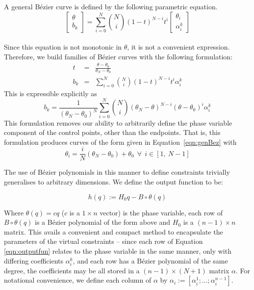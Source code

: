 A general Bézier curve is defined by the following parametric equation.
\begin{equation}
	\begin{bmatrix}
		\theta \\ b_k
	\end{bmatrix}
	=
	\sum_{i=0}^{N}\binom{N}{i}\left(1-t\right)^{N-i}t^i
	\begin{bmatrix}
		\theta_i \\ \alpha^k_i
	\end{bmatrix} \label{eqn:genBez}
\end{equation} \\
Since this equation is not monotonic in $\theta$, it is not a convenient expression. Therefore, we build families of Bézier curves with the following formulation:
\begin{eqnarray}
	t &=& \frac{\theta - \theta_0}{\theta_N - \theta_0} \\
	b_k &=& \sum_{i=0}^{N}\binom{N}{i}\left(1-t\right)^{N-i}t^i\alpha^k_i
\end{eqnarray}
This is expressible explicitly as
\begin{equation}
	b_k = \frac{1}{\left(\theta_N - \theta_0\right)^N}\sum_{i=0}^{N}\binom{N}{i}
		\left(\theta_N - \theta\right)^{N-i}
		\left(\theta - \theta_0\right)^i\alpha^k_i \label{eqn:expBez}
\end{equation}
This formulation removes our ability to arbitrarily define the phase variable component of the control points, other than the endpoints. That is, this formulation produces curves of the form given in Equation~\ref{eqn:genBez} with
\begin{equation}
	\theta_i = \frac{i}{N}\left(\theta_N-\theta_0\right) + \theta_0 ~~
	\forall ~~ i \in \left[1,~N-1\right]
\end{equation}

The use of Bézier polynomials in this manner to define constraints trivially generalises to arbitrary dimensions. We define the output function to be:

\begin{equation} \label{eqn:outputfun}
	h(q) := H_0 q - B \circ \theta(q)
\end{equation}

Where $\theta(q) = cq$ ($c$ is a $1\times n$ vector) is the phase variable, each row of $B\circ\theta(q)$ is a Bézier polynomial of the form above and $H_0$ is a $(n-1)\times n$ matrix. This avails a convenient and compact method to encapsulate the parameters of the virtual constraints -- since each row of Equation \ref{eqn:outputfun} relates to the phase variable in the same manner, only with differing coefficients $\alpha_i^k$, and each row has a Bézier polynomial of the same degree, the coefficients may be all stored in a $(n-1)\times(N+1)$ matrix $\alpha$. For notational convenience, we define each column of $\alpha$ by $\alpha_i := [\alpha_i^1; \ldots; \alpha_i^{n-1}]$. \\

